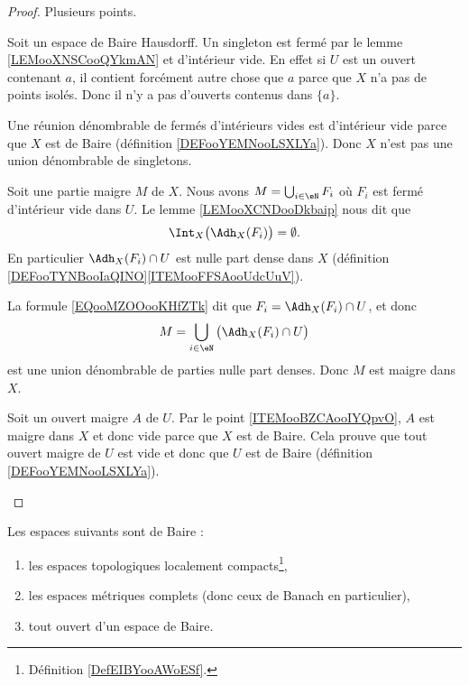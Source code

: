 \begin{proof}
	Plusieurs points.
	\begin{subproof}
		Soit un espace de Baire Hausdorff. Un singleton est fermé par le lemme \ref{LEMooXNSCooQYkmAN} et d'intérieur vide. En effet si \( U\) est un ouvert contenant \( a\), il contient forcément autre chose que \( a\) parce que \( X\) n'a pas de points isolés. Donc il n'y a pas d'ouverts contenus dans \( \{ a \}\).

		Une réunion dénombrable de fermés d'intérieurs vides est d'intérieur vide parce que \( X\) est de Baire (définition \ref{DEFooYEMNooLSXLYa}). Donc \( X\) n'est pas une union dénombrable de singletons.

		Soit une partie maigre \( M\) de \( X\). Nous avons \( M=\bigcup_{i\in \eN}F_i\) où \( F_i\) est fermé d'intérieur vide dans \( U\). Le lemme \ref{LEMooXCNDooDkbaip} nous dit que
		\begin{equation}
			\Int_X\big( \Adh_X(F_i) \big)=\emptyset.
		\end{equation}
		En particulier \( \Adh_X(F_i)\cap U\) est nulle part dense dans \( X\) (définition \ref{DEFooTYNBooIaQINO}\ref{ITEMooFFSAooUdcUuV}).

		La formule \eqref{EQooMZOOooKHfZTk} dit que \( F_i=\Adh_X(F_i)\cap U\), et donc
		\begin{equation}
			M=\bigcup_{i\in \eN}\big( \Adh_X(F_i)\cap U \big)
		\end{equation}
		est une union dénombrable de parties nulle part denses. Donc \( M\) est maigre dans \( X\).


		Soit un ouvert maigre \( A\) de \( U\). Par le point \ref{ITEMooBZCAooIYQpvO}, \( A\) est maigre dans \( X\) et donc vide parce que \( X\) est de Baire. Cela prouve que tout ouvert maigre de \( U\) est vide et donc que \( U\) est de Baire (définition \ref{DEFooYEMNooLSXLYa}).
	\end{subproof}
\end{proof}


\begin{theorem}    \label{ThoBBIljNM}
	Les espaces suivants sont de Baire :
	\begin{enumerate}
		\item
		      les espaces topologiques localement compacts\footnote{Définition \ref{DefEIBYooAWoESf}.},
		\item
		      les espaces métriques complets (donc ceux de Banach en particulier),
		\item
		      tout ouvert d'un espace de Baire.
	\end{enumerate}
\end{theorem}

